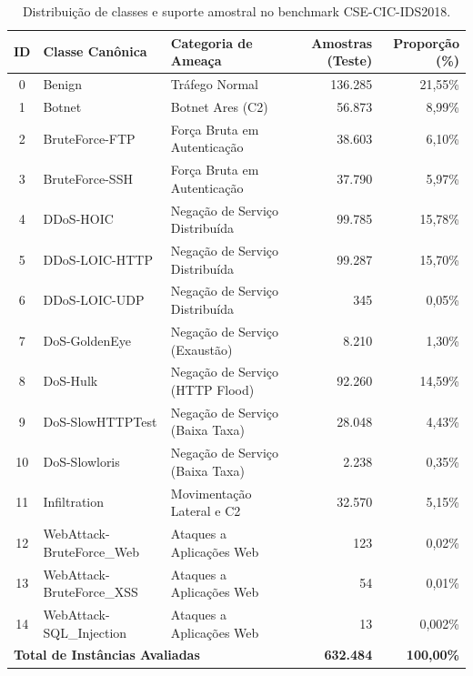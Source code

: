 \begin{table}[htb]
\centering
\caption{Distribuição de classes e suporte amostral no benchmark CSE-CIC-IDS2018.}
\label{tab:distribuicao_csecicids2018}
\small
\begin{tabularx}{\textwidth}{|c|l|X|r|r|}
\hline
\textbf{ID} & \textbf{Classe Canônica} & \textbf{Categoria de Ameaça} & \textbf{Amostras (Teste)} & \textbf{Proporção (\%)} \\ \hline
0 & Benign & Tráfego Normal & 136.285 & 21,55\% \\ \hline
1 & Botnet & Botnet Ares (C2) & 56.873 & 8,99\% \\ \hline
2 & BruteForce-FTP & Força Bruta em Autenticação & 38.603 & 6,10\% \\ \hline
3 & BruteForce-SSH & Força Bruta em Autenticação & 37.790 & 5,97\% \\ \hline
4 & DDoS-HOIC & Negação de Serviço Distribuída & 99.785 & 15,78\% \\ \hline
5 & DDoS-LOIC-HTTP & Negação de Serviço Distribuída & 99.287 & 15,70\% \\ \hline
6 & DDoS-LOIC-UDP & Negação de Serviço Distribuída & 345 & 0,05\% \\ \hline
7 & DoS-GoldenEye & Negação de Serviço (Exaustão) & 8.210 & 1,30\% \\ \hline
8 & DoS-Hulk & Negação de Serviço (HTTP Flood) & 92.260 & 14,59\% \\ \hline
9 & DoS-SlowHTTPTest & Negação de Serviço (Baixa Taxa) & 28.048 & 4,43\% \\ \hline
10 & DoS-Slowloris & Negação de Serviço (Baixa Taxa) & 2.238 & 0,35\% \\ \hline
11 & Infiltration & Movimentação Lateral e C2 & 32.570 & 5,15\% \\ \hline
12 & WebAttack-BruteForce\_Web & Ataques a Aplicações Web & 123 & 0,02\% \\ \hline
13 & WebAttack-BruteForce\_XSS & Ataques a Aplicações Web & 54 & 0,01\% \\ \hline
14 & WebAttack-SQL\_Injection & Ataques a Aplicações Web & 13 & 0,002\% \\ \hline
\multicolumn{3}{|l|}{\textbf{Total de Instâncias Avaliadas}} & \textbf{632.484} & \textbf{100,00\%} \\ \hline
\end{tabularx}
\end{table}


